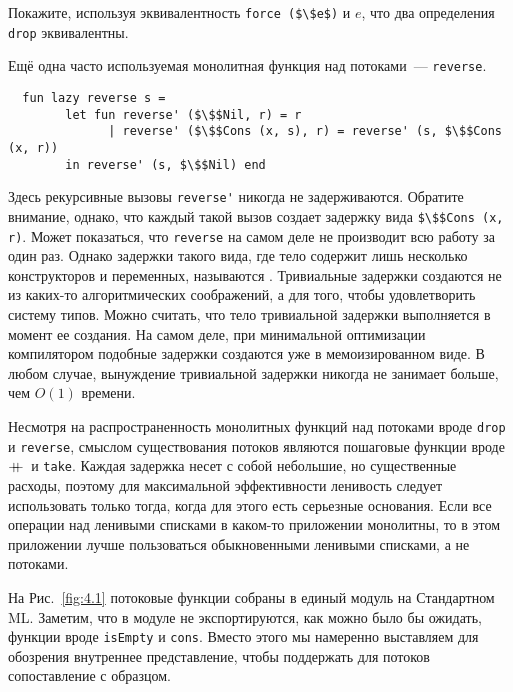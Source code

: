 \begin{exercise}\label{ex:4.1}
  Покажите, используя эквивалентность \lstinline!force ($\$e$)! и $e$,
  что два определения \lstinline!drop! эквивалентны.
\end{exercise}

Ещё одна часто используемая монолитная функция над потоками~---
\lstinline!reverse!.
\begin{lstlisting}
  fun lazy reverse s =
        let fun reverse' ($\$$Nil, r) = r
              | reverse' ($\$$Cons (x, s), r) = reverse' (s, $\$$Cons (x, r))
        in reverse' (s, $\$$Nil) end
\end{lstlisting}
Здесь рекурсивные вызовы \lstinline!reverse'! никогда не
задерживаются. Обратите внимание, однако, что каждый такой вызов
создает задержку вида \lstinline!$\$$Cons (x, r)!. Может показаться,
что \lstinline!reverse! на самом деле не производит всю работу за один
раз. Однако задержки такого вида, где тело содержит лишь
несколько конструкторов и переменных, называются
. Тривиальные задержки создаются не из
каких-то алгоритмических соображений, а для того, чтобы удовлетворить
систему типов. Можно считать, что тело тривиальной задержки
выполняется в момент ее создания.  На самом деле, при минимальной
оптимизации компилятором подобные задержки создаются уже в
мемоизированном виде. В любом случае, вынуждение тривиальной
задержки никогда не занимает больше, чем $O(1)$ времени.

Несмотря на распространенность монолитных функций над потоками вроде
\lstinline!drop! и \lstinline!reverse!, смыслом существования потоков
являются пошаговые функции вроде $+\!\!\!+\,$ и \lstinline!take!. Каждая
задержка несет с собой небольшие, но существенные расходы, поэтому для
максимальной эффективности ленивость следует использовать только тогда,
когда для этого есть серьезные основания. Если все операции над
ленивыми списками в каком-то приложении монолитны, то в этом
приложении лучше пользоваться обыкновенными ленивыми списками, а не
потоками.

На Рис.~\ref{fig:4.1} потоковые функции собраны в единый модуль на
Стандартном ML. Заметим, что в модуле не экспортируются, как можно
было бы ожидать,  функции вроде \lstinline!isEmpty! и
\lstinline!cons!. Вместо этого мы намеренно выставляем для обозрения
внутреннее представление, чтобы поддержать для потоков сопоставление с
образцом.

